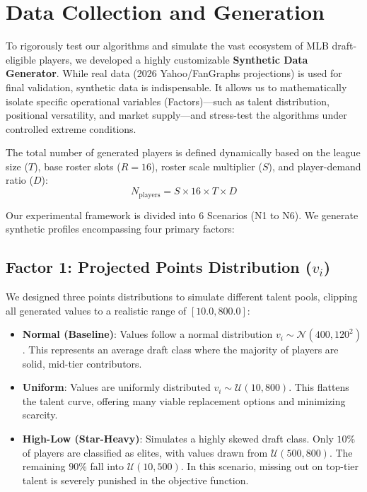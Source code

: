 \documentclass[11pt,a4paper]{article}
\begin{document}
\section{Data Collection and Generation}

To rigorously test our algorithms and simulate the vast ecosystem of MLB draft-eligible players, we developed a highly customizable \textbf{Synthetic Data Generator}. While real data (2026 Yahoo/FanGraphs projections) is used for final validation, synthetic data is indispensable. It allows us to mathematically isolate specific operational variables (Factors)—such as talent distribution, positional versatility, and market supply—and stress-test the algorithms under controlled extreme conditions.

The total number of generated players is defined dynamically based on the league size ($T$), base roster slots ($R = 16$), roster scale multiplier ($S$), and player-demand ratio ($D$): 
\[ N_{\text{players}} = S \times 16 \times T \times D \]

Our experimental framework is divided into 6 Scenarios (N1 to N6). We generate synthetic profiles encompassing four primary factors:

\subsection{Factor 1: Projected Points Distribution ($v_i$)}
We designed three points distributions to simulate different talent pools, clipping all generated values to a realistic range of $[10.0, 800.0]$:
\begin{itemize}[leftmargin=1.5em]
    \item \textbf{Normal (Baseline)}: Values follow a normal distribution $v_i \sim \mathcal{N}(400, 120^2)$. This represents an average draft class where the majority of players are solid, mid-tier contributors.
    \item \textbf{Uniform}: Values are uniformly distributed $v_i \sim \mathcal{U}(10, 800)$. This flattens the talent curve, offering many viable replacement options and minimizing scarcity.
    \item \textbf{High-Low (Star-Heavy)}: Simulates a highly skewed draft class. Only $10\%$ of players are classified as elites, with values drawn from $\mathcal{U}(500, 800)$. The remaining $90\%$ fall into $\mathcal{U}(10, 500)$. In this scenario, missing out on top-tier talent is severely punished in the objective function.
\end{itemize}
\end{document}
